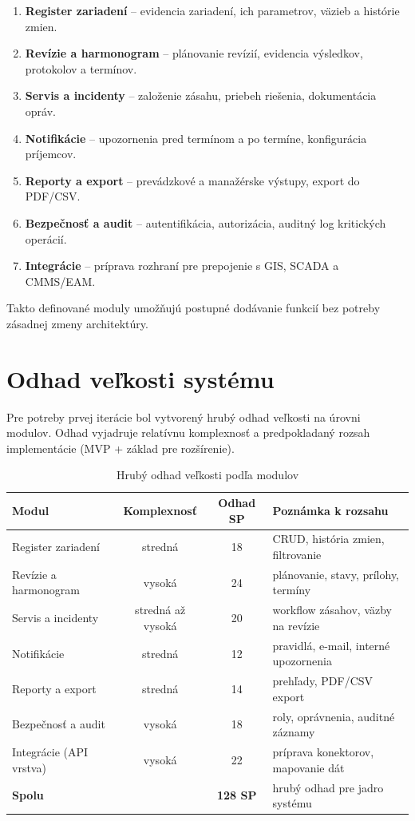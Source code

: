 \begin{enumerate}[label=\arabic*.]
\item \textbf{Register zariadení} -- evidencia zariadení, ich parametrov, väzieb a histórie zmien.
\item \textbf{Revízie a harmonogram} -- plánovanie revízií, evidencia výsledkov, protokolov a termínov.
\item \textbf{Servis a incidenty} -- založenie zásahu, priebeh riešenia, dokumentácia opráv.
\item \textbf{Notifikácie} -- upozornenia pred termínom a po termíne, konfigurácia príjemcov.
\item \textbf{Reporty a export} -- prevádzkové a manažérske výstupy, export do PDF/CSV.
\item \textbf{Bezpečnosť a audit} -- autentifikácia, autorizácia, auditný log kritických operácií.
\item \textbf{Integrácie} -- príprava rozhraní pre prepojenie s GIS, SCADA a CMMS/EAM.
\end{enumerate}

Takto definované moduly umožňujú postupné dodávanie funkcií bez potreby zásadnej zmeny architektúry.

\section{Odhad veľkosti systému}

Pre potreby prvej iterácie bol vytvorený hrubý odhad veľkosti na úrovni modulov. Odhad vyjadruje relatívnu komplexnosť a predpokladaný rozsah implementácie (MVP + základ pre rozšírenie).

\begin{table}[htbp]
\centering
\caption{Hrubý odhad veľkosti podľa modulov}
\label{tab:rough-size-estimate}
\small
\begin{tabular}{p{4.2cm} c c p{4.3cm}}
\toprule
Modul & Komplexnosť & Odhad SP & Poznámka k rozsahu \\
\midrule
Register zariadení & stredná & 18 & CRUD, história zmien, filtrovanie \\
Revízie a harmonogram & vysoká & 24 & plánovanie, stavy, prílohy, termíny \\
Servis a incidenty & stredná až vysoká & 20 & workflow zásahov, väzby na revízie \\
Notifikácie & stredná & 12 & pravidlá, e-mail, interné upozornenia \\
Reporty a export & stredná & 14 & prehľady, PDF/CSV export \\
Bezpečnosť a audit & vysoká & 18 & roly, oprávnenia, auditné záznamy \\
Integrácie (API vrstva) & vysoká & 22 & príprava konektorov, mapovanie dát \\
\midrule
\textbf{Spolu} &  & \textbf{128 SP} & hrubý odhad pre jadro systému \\
\bottomrule
\end{tabular}
\end{table}


